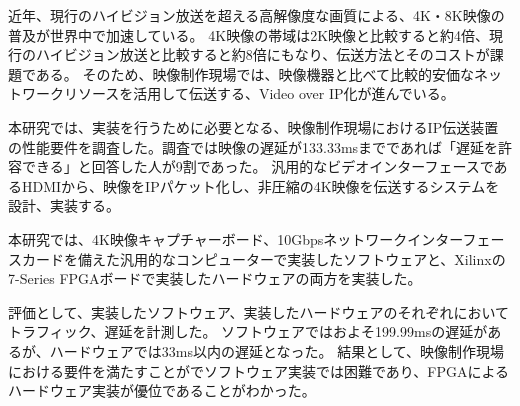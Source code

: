
\begin{jabstract}

近年、現行のハイビジョン放送を超える高解像度な画質による、4K・8K映像の普及が世界中で加速している。
4K映像の帯域は2K映像と比較すると約4倍、現行のハイビジョン放送と比較すると約8倍にもなり、伝送方法とそのコストが課題である。
そのため、映像制作現場では、映像機器と比べて比較的安価なネットワークリソースを活用して伝送する、Video over IP化が進んでいる。

本研究では、実装を行うために必要となる、映像制作現場におけるIP伝送装置の性能要件を調査した。調査では映像の遅延が133.33msまでであれば「遅延を許容できる」と回答した人が9割であった。
汎用的なビデオインターフェースであるHDMIから、映像をIPパケット化し、非圧縮の4K映像を伝送するシステムを設計、実装する。

本研究では、4K映像キャプチャーボード、10Gbpsネットワークインターフェースカードを備えた汎用的なコンピューターで実装したソフトウェアと、Xilinxの7-Series FPGAボードで実装したハードウェアの両方を実装した。

評価として、実装したソフトウェア、実装したハードウェアのそれぞれにおいてトラフィック、遅延を計測した。
ソフトウェアではおよそ199.99msの遅延があるが、ハードウェアでは33ms以内の遅延となった。
結果として、映像制作現場における要件を満たすことがでソフトウェア実装では困難であり、FPGAによるハードウェア実装が優位であることがわかった。

\end{jabstract}


